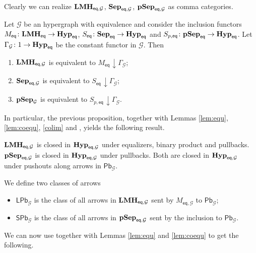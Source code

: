 \documentclass[3p]{elsarticle}
\newcommand{\pbc}{\mathsf{Pb}}
\newcommand{\pbl}{\mathsf{LPb}}
\newcommand{\pbs}{\mathsf{SPb}}
\newcommand{\eq}{\mathsf{eq}}
\newcommand{\catname}[1]{\textbf{\textup{#1}}}
\newcommand{\lmo}{\catname{LMH}}
\newcommand{\hyp}{\catname{Hyp}}
\newcommand{\pshyp}{\catname{pSep}}
\newcommand{\shyp}{\catname{Sep}}
\newcommand{\EqHyp}{\catname{Hyp}_{\mathsf{eq}}} %
\newcommand{\EqsHyp}{\catname{Sep}_{\mathsf{eq}}}
\newcommand{\Eqlmo}{\catname{LMH}_{\mathsf{eq}}}
\renewcommand{\comma}[2]{#1\hspace{1pt} {\downarrow}#2}
\theoremstyle{remark}
\theoremstyle{definition}
\begin{document}
 Clearly we can realize $\lmo_{\eq, \mathcal{G}}$, $\shyp_{\eq, \mathcal{G}}$, $\pshyp_{\eq, \mathcal{G}}$ as comma categories.
 
 \begin{prop}\label{prop:eti}
 	Let $\mathcal{G}$ be an hypergraph with equivalence and consider the inclusion functors $M_{\eq}\colon \Eqlmo\to \EqHyp$, $S_{\eq}\colon \EqsHyp \to \EqHyp$ and $S_{p, \eq}\colon \pshyp_{\eq}\to \EqHyp$. Let $\Gamma_{\mathcal{G}}\colon 1\to \EqHyp$ be the constant functor in $\mathcal{G}$. Then
 	\begin{enumerate}
 		\item $\lmo_{\eq, \mathcal{G}}$ is equivalent to $\comma{M_\eq}{\Gamma_{\mathcal{G}}}$;
 		\item $\shyp_{\eq, \mathcal{G}}$ is equivalent to $\comma{S_\eq}{\Gamma_{\mathcal{G}}}$; 
 		\item $\pshyp_{\mathcal{G}}$ is equivalent to $\comma{S_{p, \eq}}{\Gamma_{\mathcal{G}}}$. 
 	\end{enumerate}
 \end{prop}
 
 In particular, the previous proposition, together with Lemmas \ref{lem:equ}, \ref{lem:coequ}, \ref{colim} and , yields the following result.
 
 \begin{cor}\label{cor:eti}
 $\lmo_{\eq, \mathcal{G}}$ is closed in $\hyp_{\eq, \mathcal{G}}$ under equalizers, binary product and pullbacks. $\pshyp_{\eq, \mathcal{G}}$ is closed in $\hyp_{\eq, \mathcal{G}}$ under pullbacks. Both are closed in  $\hyp_{\eq, \mathcal{G}}$ under pushouts along arrows in $\pbc_{\mathcal{G}}$.
 \end{cor}

\begin{defi}We define two classes of arrows
	\begin{itemize}
		\item $\pbl_{\mathcal{G}}$ is the class of all arrows in $\lmo_{\eq, \mathcal{G}}$ sent by $M_{\eq, \mathcal{G}}$ to $\pbc_{\mathcal{G}}$;
		\item $\pbs_{\mathcal{G}}$ is the class of all arrows in $\pshyp_{\eq, \mathcal{G}}$ sent by the inclusion  to $\pbc_{\mathcal{G}}$.
	\end{itemize}
\end{defi}

We can  now use  together with Lemmas \ref{lem:equ} and \ref{lem:coequ} to get the following.
\end{document}
